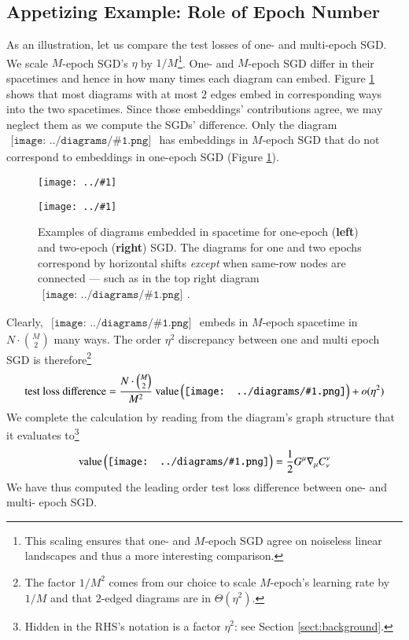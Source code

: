 \documentclass{article}
\newcommand{\dvalue}{\text{\textnormal{value}}}
\newcommand{\wrap}[1]{\left(#1\right)}
\newcommand{\plotmooh}[3]{
    \texttt{[image: ../\#1]}
}
\newcommand{\sdia}[1]{\begin{gathered}\texttt{[image: ../diagrams/\#1.png]}\end{gathered}}
\begin{document}
    \subsection{Appetizing Example: Role of Epoch Number}
            As an illustration, let us compare the test losses of one- and
            multi-epoch SGD.  We scale $M$-epoch SGD's $\eta$ by
            $1/M$\footnote{
                This scaling ensures that one- and $M$-epoch SGD
                agree on noiseless linear landscapes and thus a 
                more interesting comparison.
            }.
            One- and $M$-epoch SGD differ in their spacetimes and hence in how
            many times each diagram can embed.  Figure \ref{fig:epoch} shows
            that most diagrams with at most $2$ edges embed in corresponding
            ways into the two spacetimes.  Since those embeddings'
            contributions agree, we may neglect them as we compute the SGDs'
            difference.  Only the diagram
            $\sdia{c(01-2)(01-12)}$ has embeddings in $M$-epoch SGD that do not
            correspond to embeddings in one-epoch SGD (Figure \ref{fig:epoch}). 

            \begin{figure}[h!] 
                \centering  
                \plotmooh{diagrams/spacetime-c}{0.32\columnwidth}{0.32\columnwidth}
                \plotmooh{diagrams/spacetime-d}{0.64\columnwidth}{0.32\columnwidth}
                \caption{
                    Examples of diagrams embedded in spacetime for one-epoch
                    ({\bf left}) and two-epoch ({\bf right}) SGD.  The diagrams
                    for one and two epochs correspond by horizontal shifts
                    \emph{except} when same-row nodes are connected --- such as
                    in the top right diagram $\sdia{c(01-2)(01-12)}$. 
                }
                \label{fig:epoch}
            \end{figure}

            Clearly, $\sdia{c(01-2)(01-12)}$ embeds in $M$-epoch spacetime in
            $N\cdot{M\choose 2}$ many ways.  The order $\eta^2$ discrepancy
            between one and multi epoch SGD is therefore\footnote{
                The factor $1/M^2$ comes from our choice to scale $M$-epoch's
                learning rate by $1/M$ and that $2$-edged diagrams 
                are in $\Theta(\eta^2)$.
            }
            $$
                \text{test loss difference} =  
                \frac{N\cdot {M\choose 2}}{M^2}~
                \dvalue\wrap{\sdia{c(01-2)(01-12)}}
                + o(\eta^2)
            $$
            We complete the calculation by reading from the diagram's graph
            structure that it evaluates to\footnote{
                Hidden in the RHS's notation is a factor $\eta^2$: see  
                Section \ref{sect:background}.
            }
            \begin{align*}
                \dvalue\wrap{\sdia{c(01-2)(01-12)}}
                = 
                \frac{1}{2} G^\mu \nabla_\mu C^{\nu}_{\nu} 
            \end{align*}
            We have thus computed the leading order test loss difference
            between one- and multi- epoch SGD.
\end{document}
